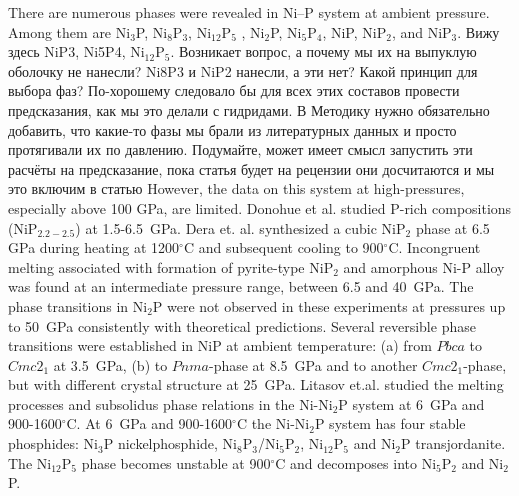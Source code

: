 \documentclass[twoside,twocolumn,9pt]{article}
\begin{document}
There are numerous phases were revealed in Ni--P system at ambient pressure. 
Among them are Ni$_3$P, Ni$_8$P$_3$, Ni$_{12}$P$_5$ , Ni$_2$P, Ni$_5$P$_4$, NiP, NiP$_2$, and NiP$_3$. 
{\color{red}Вижу здесь NiP3, Ni5P4, Ni$_{12}$P$_5$. Возникает вопрос, а почему мы их на выпуклую оболочку не нанесли? Ni8P3 и NiP2 нанесли, а эти нет? Какой принцип для выбора фаз? По-хорошему следовало бы для всех этих составов провести предсказания, как мы это делали с гидридами. В Методику нужно обязательно добавить, что какие-то фазы мы брали из литературных данных и просто протягивали их по давлению. Подумайте, может имеет смысл запустить эти расчёты на предсказание, пока статья будет на рецензии они досчитаются и мы это включим в статью}
However, the data on this system at high-pressures, especially above 100 GPa, are limited.
Donohue et al.\cite{Donohue-1968} studied P-rich compositions (NiP$_{2.2-2.5}$) at 1.5-6.5~GPa. 
Dera et. al.\cite{Dera-2009-JGR} synthesized a cubic NiP$_2$ phase at 6.5 GPa during heating at 1200$^\circ$C and subsequent cooling to 900$^\circ$C. 
Incongruent melting associated with formation of pyrite-type NiP$_2$ and amorphous Ni-P alloy was found at an intermediate pressure range, between 6.5 and 40~GPa.
The phase transitions in Ni$_2$P were not observed in these experiments at pressures up to 50~GPa consistently with theoretical predictions.\cite{Nisar-2010-EPSL}
Several reversible phase transitions were established in NiP at ambient temperature: (a) from $Pbca$ to $Cmc2_1$ at 3.5~GPa, (b) to $Pnma$-phase at 8.5~GPa and to another $Cmc2_1$-phase, but with different crystal structure at 25~GPa.\cite{Dera-2011-JSSC, Dera2013-PCM}
{\color{blue}
Litasov et.al. studied the melting processes and subsolidus phase relations in the Ni-Ni$_2$P system at 6~GPa and 900-1600$^\circ$C. 
At 6~GPa and 900-1600$^\circ$C the Ni-Ni$_2$P system has four stable phosphides: Ni$_3$P nickelphosphide, Ni$_8$P$_3$/Ni$_5$P$_2$, Ni$_{12}$P$_5$ and Ni$_2$P transjordanite.  
The Ni$_{12}$P$_5$ phase becomes unstable at 900$^\circ$C and decomposes into Ni$_5$P$_2$ and Ni$_2$P. 
~\cite{Litasov-2019-HPR-NiP}
}
\end{document}
